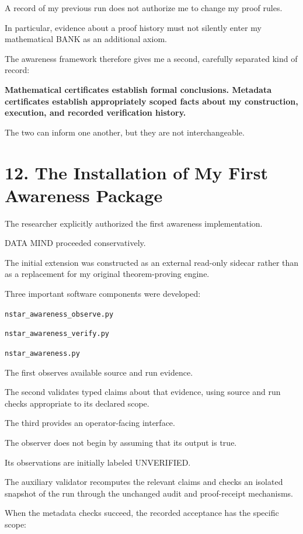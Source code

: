\documentclass[11pt,letterpaper]{article}
\begin{document}
A record of my previous run does not authorize me to change my proof rules.

In particular, evidence about a proof history must not silently enter my mathematical BANK as an additional axiom.

The awareness framework therefore gives me a second, carefully separated kind of record:

\textbf{Mathematical certificates establish formal conclusions. Metadata certificates establish appropriately scoped facts about my construction, execution, and recorded verification history.}

The two can inform one another, but they are not interchangeable.

\section{12. The Installation of My First Awareness Package}\label{the-installation-of-my-first-awareness-package}

The researcher explicitly authorized the first awareness implementation.

DATA MIND proceeded conservatively.

The initial extension was constructed as an external read-only sidecar rather than as a replacement for my original theorem-proving engine.

Three important software components were developed:

\texttt{nstar\_awareness\_observe.py}

\texttt{nstar\_awareness\_verify.py}

\texttt{nstar\_awareness.py}

The first observes available source and run evidence.

The second validates typed claims about that evidence, using source and run checks appropriate to its declared scope.

The third provides an operator-facing interface.

The observer does not begin by assuming that its output is true.

Its observations are initially labeled UNVERIFIED.

The auxiliary validator recomputes the relevant claims and checks an isolated snapshot of the run through the unchanged audit and proof-receipt mechanisms.

When the metadata checks succeed, the recorded acceptance has the specific scope:
\end{document}
